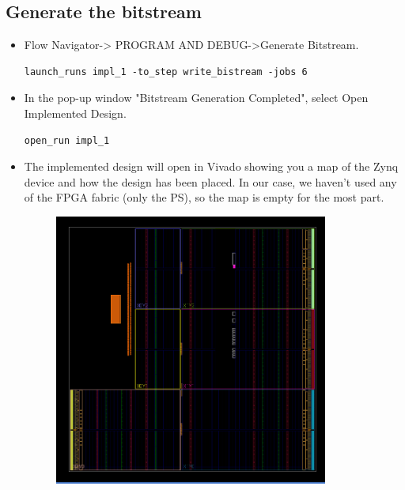 \documentclass[a4paper,12pt,twoside]{article}
\begin{document}
\subsection{Generate the bitstream}
\begin{itemize}
    \item Flow Navigator-> PROGRAM AND DEBUG->Generate Bitstream.
    \begin{verbatim}
launch_runs impl_1 -to_step write_bistream -jobs 6
    \end{verbatim}
    \item In the pop-up window "Bitstream Generation Completed", select Open Implemented Design.
    \begin{verbatim}
open_run impl_1
    \end{verbatim}
    \item The implemented design will open in Vivado showing you a map of the Zynq device and how the design has been placed. In our case, we haven’t used any of the FPGA fabric (only the PS), so the map is empty for the most part.
    \begin{figure}[H]
        \centering
        \includegraphics[width=0.85\textwidth]{images/7.png}
    \end{figure}
\end{itemize}
\end{document}
